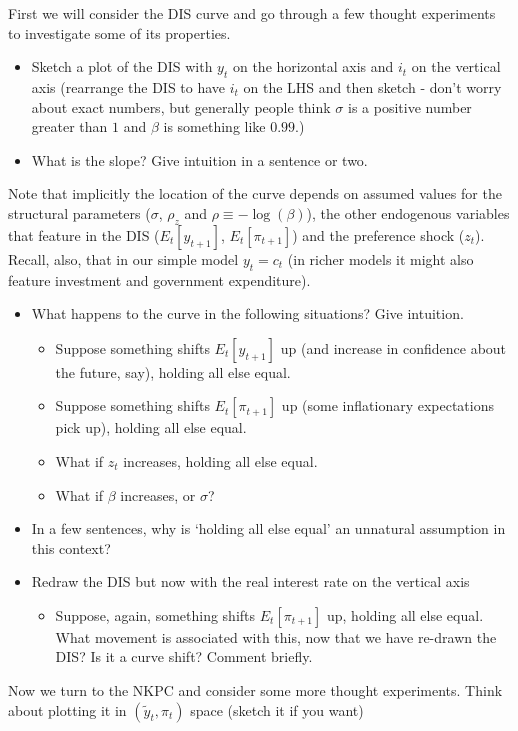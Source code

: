 \documentclass[authoryear,11pt]{elsarticle}
\begin{document}
First we will consider the DIS curve and go through a few thought experiments to investigate some of its properties.
\begin{itemize}
\item	Sketch a plot of the DIS with $y_{t}$ on the horizontal axis and $i_{t}$ on the vertical axis (rearrange the DIS to have $i_{t}$ on the LHS and then sketch - don't worry about exact numbers, but generally people think $\sigma$ is a positive number greater than $1$ and $\beta$ is something like $0.99$.)
\item	What is the slope? Give intuition in a sentence or two.
\end{itemize}
Note that implicitly the location of the curve depends on assumed values for the structural parameters ($\sigma$, $\rho_{z}$ and $\rho \equiv -\log{(\beta)}$), the other endogenous variables that feature in the DIS ($E_{t}[y_{t+1}]$, $E_{t}[\pi_{t+1}]$) and the preference shock ($z_{t}$). Recall, also, that in our simple model $y_{t}=c_{t}$ (in richer models it might also feature investment and government expenditure).
\begin{itemize}
\item	What happens to the curve in the following situations? Give intuition.
	\begin{itemize}
	\item	Suppose something shifts $E_{t}[y_{t+1}]$ up (and increase in confidence about the future, say), holding all else equal.
	\item	Suppose something shifts $E_{t}[\pi_{t+1}]$ up (some inflationary expectations pick up), holding all else equal.
	\item	What if $z_{t}$ increases, holding all else equal.
	\item	What if $\beta$ increases, or $\sigma$?
	\end{itemize}
\item	In a few sentences, why is `holding all else equal' an unnatural assumption in this context?
\item	Redraw the DIS but now with the real interest rate on the vertical axis
	\begin{itemize}
	\item	Suppose, again, something shifts $E_{t}[\pi_{t+1}]$ up, holding all else equal. What movement is associated with this, now that we have re-drawn the DIS? Is it a curve shift? Comment briefly.
	\end{itemize}
\end{itemize}
Now we turn to the NKPC and consider some more thought experiments. Think about plotting it in $(\tilde{y}_{t},\pi_{t})$ space (sketch it if you want)
\end{document}
